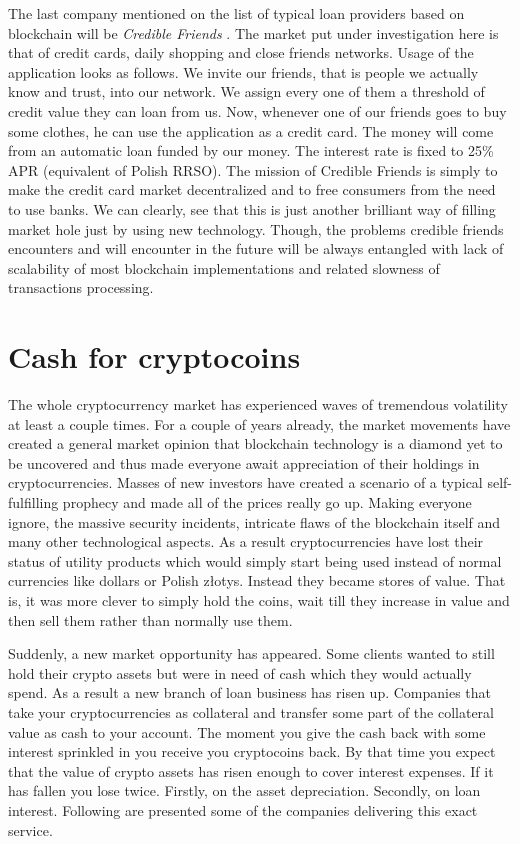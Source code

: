 \documentclass[a4paper,12pt,twoside,openany]{report}
\begin{document}
The last company mentioned on the list of typical loan providers based on blockchain will be \textit{Credible Friends} \cite{credible}. The market put under investigation here is that of credit cards, daily shopping and close friends networks. Usage of the application looks as follows. We invite our friends, that is people we actually know and trust, into our network. We assign every one of them a threshold of credit value they can loan from us. Now, whenever one of our friends goes to buy some clothes, he can use the application as a credit card. The money will come from an automatic loan funded by our money.   The interest rate is fixed to 25\% APR (equivalent of Polish RRSO). The mission of Credible Friends is simply to make the credit card market decentralized and to free consumers from the need to use banks. We can clearly, see that this is just another brilliant way of filling market hole just by using new technology. Though, the problems credible friends encounters and will encounter in the future will be always entangled with lack of scalability of most blockchain implementations and related slowness of transactions processing.

\section{Cash for cryptocoins}

The whole cryptocurrency market has experienced waves of tremendous volatility at least a couple times. For a couple of years already, the market movements have created a general market opinion that blockchain technology is a diamond yet to be uncovered and thus made everyone await appreciation of their holdings in cryptocurrencies. Masses of new investors have created a scenario of a typical self-fulfilling prophecy and made all of the prices really go up. Making everyone ignore, the massive security incidents, intricate flaws of the blockchain itself and many other technological aspects. As a result cryptocurrencies have lost their status of utility products which would simply start being used instead of normal currencies like dollars or Polish złotys. Instead they became stores of value. That is, it was more  clever to simply hold the coins, wait till they increase in value and then sell them rather than normally use them. 

Suddenly, a new market opportunity has appeared. Some clients wanted to still hold their crypto assets but were in need of cash which they would actually spend. As a result a new branch of loan business has risen up. Companies that take your cryptocurrencies as collateral and transfer some part of the collateral value as cash to your account. The moment you give the cash back with some interest sprinkled in you receive you cryptocoins back. By that time you expect that the value of crypto assets has risen enough to cover interest expenses. If it has fallen you lose twice. Firstly, on the asset depreciation. Secondly, on loan interest. Following are presented some of the companies delivering this exact service.
\end{document}
